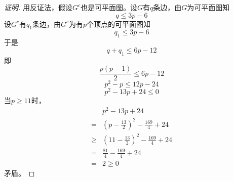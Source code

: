 \begin{proof}[证明]
    用反证法，假设$G^c$也是可平面图。设$G$有$q$条边，由$G$为可平面图知
  \[q \leq 3p - 6\]
  设$G^c$有$q_1$条边，由$G^c$为有$p$个顶点的可平面图知
  \[q_1 \leq 3p - 6\]
  于是
  \[q + q _1 \leq 6p-12\]
  即
  \[\frac{p(p-1)}{2} \leq 6p-12\]
  \[p^2-p \leq 12p-24\]
  \[p^2-13p+24 \leq 0\]
  当$p\geq 11$时，
  \begin{equation*}
    \begin{split}
     &p^2-13p+24\\
     =&(p-\frac{13}{2})^2-\frac{169}{4}+24\\
     \geq&(11-\frac{13}{2})^2-\frac{169}{4} + 24\\
     =&\frac{81}{4} - \frac{169}{4} + 24\\
     =&2 \geq 0
    \end{split}
  \end{equation*}
  矛盾。
\end{proof}

